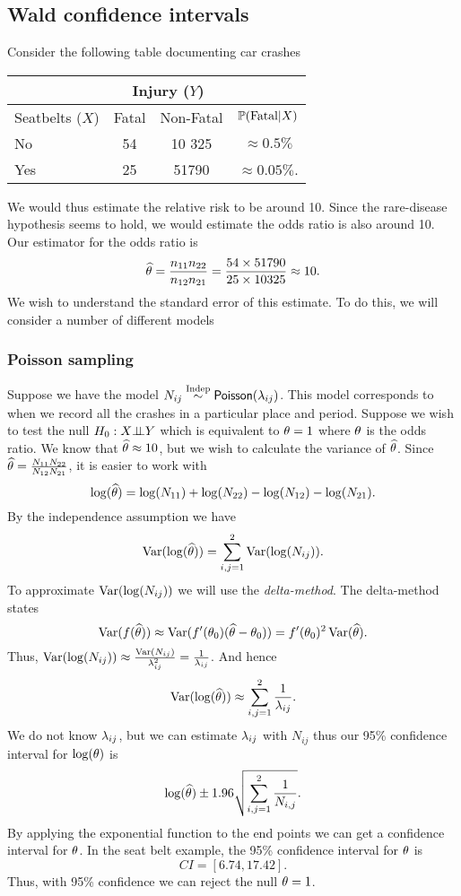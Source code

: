 \subsection{Wald confidence intervals}
Consider the following table documenting car crashes 
\begin{center}
    \begin{tabular}{l|cc|c}
        &\multicolumn{2}{|c|}{Injury ($Y$)}&\\
        \hline 
        Seatbelts ($X$) & Fatal & Non-Fatal & ${\mathbb{P}}(\text{Fatal}|X)$\\
        \hline 
        No & 54 & 10 325 & $\approx 0.5\%$\\
        Yes & 25 & 51790 & $\approx 0.05\%$.
        
    \end{tabular}
\end{center}
We would thus estimate the relative risk to be around 10. Since the rare-disease hypothesis seems to hold, we would estimate the odds ratio is also around 10. Our estimator for the odds ratio is
\[\widehat{{\theta}} = \frac{n_{11}n_{22}}{n_{12}n_{21}} = \frac{54\times 51790}{25\times 10325} \approx 10. \]
We wish to understand the standard error of this estimate. To do this, we will consider a number of different models
\subsubsection{Poisson sampling}
Suppose we have the model $N_{ij} \stackrel{\text{Indep}}{\sim} \mathsf{Poisson}(\lambda_{ij})$. This model corresponds to when we record all the crashes in a particular place and period. Suppose we wish to test the null $H_0:X {\perp\!\!\!\perp} Y$ which is equivalent to ${\theta} = 1$ where ${\theta}$ is the odds ratio. We know that $\widehat{{\theta}} \approx 10$, but we wish to calculate the variance of $\widehat{{\theta}}$. Since $\widehat{{\theta}} = \frac{N_{11}N_{22}}{N_{12}N_{21}}$, it is easier to work with \[\log(\widehat{{\theta}}) = \log(N_{11})+\log(N_{22})-\log(N_{12})-\log(N_{21}).\] By the independence assumption we have 
\[\operatorname{Var}(\log(\widehat{{\theta}})) = \sum_{i,j=1}^2 \operatorname{Var}(\log(N_{ij})). \]
To approximate $\operatorname{Var}(\log(N_{ij}))$ we will use the \emph{delta-method}. The delta-method states 
\[\operatorname{Var}(f(\widehat{{\theta}})) \approx \operatorname{Var}(f'({\theta}_0)(\widehat{{\theta}}-{\theta}_0)) = f'({\theta}_0)^2\operatorname{Var}(\widehat{{\theta}}). \]
Thus, $\operatorname{Var}(\log(N_{ij})) \approx \frac{\operatorname{Var}(N_{ij})}{\lambda_{ij}^2} = \frac{1}{\lambda_{ij}}$. And hence
\[\operatorname{Var}(\log(\widehat{{\theta}})) \approx \sum_{i,j=1}^2 \frac{1}{\lambda_{ij}}. \]
We do not know $\lambda_{ij}$, but we can estimate $\lambda_{ij}$ with $N_{ij}$ thus our 95\% confidence interval for $\log({\theta})$ is 
\[\log(\widehat{{\theta}})\pm 1.96\sqrt{\sum_{i,j=1}^2 \frac{1}{N_{i,j}}}. \]
By applying the exponential function to the end points we can get a confidence interval for ${\theta}$. In the seat belt example, the 95\% confidence interval for ${\theta}$ is
\[CI = [6.74, 17.42]. \]
Thus, with 95\% confidence we can reject the null ${\theta} = 1$. 
